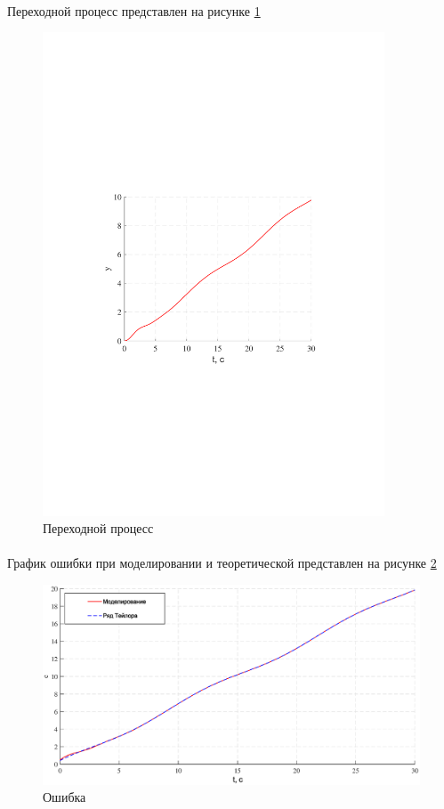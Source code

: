 \documentclass[a4paper,12pt]{article}
\begin{document}
	\paragraph {}Переходной процесс представлен на рисунке \ref{s_20}
	
	\begin{figure}[h]
		\renewcommand{\figurename}{Рисунок}
		\centering
		\includegraphics[width=4in]{ph4MOD.pdf}
		\caption{Переходной процесс}
		\label{s_20}
	\end{figure}
	\newpage
	\paragraph {}График ошибки при моделировании и теоретической представлен на рисунке \ref{s_21}
	
	\begin{figure}[h]
		\renewcommand{\figurename}{Рисунок}
		\centering
		\includegraphics[width=6in]{TailorError.eps}
		\caption{Ошибка}
		\label{s_21}
	\end{figure}
	
\end{document}

